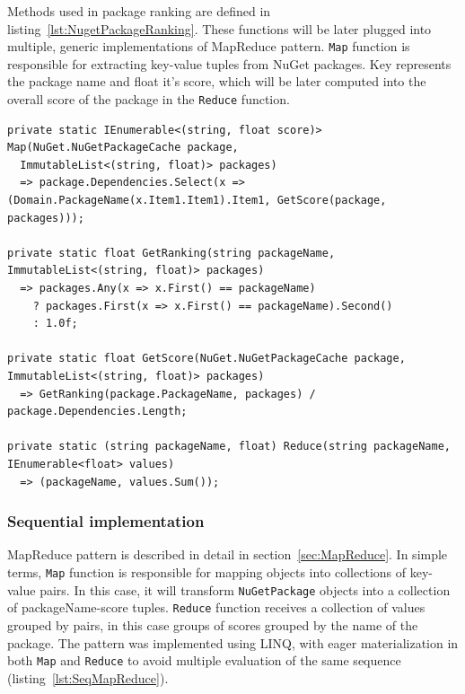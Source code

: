 Methods used in package ranking are defined in listing~\ref{lst:NugetPackageRanking}. These functions will be later plugged into multiple, generic implementations of MapReduce pattern. \texttt{Map} function is responsible for extracting key-value tuples from NuGet packages. Key represents the package name and float it's score, which will be later computed into the overall score of the package in the \texttt{Reduce} function.

\begin{lstlisting}[language={[sharp]c}, style=sharpcstyle, caption={Nuget package ranking functions}, label={lst:NugetPackageRanking},
numbers=none, xleftmargin=0pt,framexleftmargin=0pt,framexrightmargin=0pt,framexbottommargin=0pt]
private static IEnumerable<(string, float score)> Map(NuGet.NuGetPackageCache package,
  ImmutableList<(string, float)> packages)
  => package.Dependencies.Select(x => (Domain.PackageName(x.Item1.Item1).Item1, GetScore(package, packages)));

private static float GetRanking(string packageName, ImmutableList<(string, float)> packages)
  => packages.Any(x => x.First() == packageName)
    ? packages.First(x => x.First() == packageName).Second()
    : 1.0f;

private static float GetScore(NuGet.NuGetPackageCache package, ImmutableList<(string, float)> packages)
  => GetRanking(package.PackageName, packages) / package.Dependencies.Length;

private static (string packageName, float) Reduce(string packageName, IEnumerable<float> values)
  => (packageName, values.Sum());
\end{lstlisting}

\subsubsection{Sequential implementation}
MapReduce pattern is described in detail in section~\ref{sec:MapReduce}. 
In simple terms, \texttt{Map} function is responsible for mapping objects into collections of key-value pairs. In this case, it will transform \texttt{NuGetPackage} objects into a collection of packageName-score tuples.  \texttt{Reduce} function receives a collection of values grouped by pairs, in this case groups of scores grouped by the name of the package. The pattern was implemented using LINQ, with eager materialization in both \texttt{Map} and \texttt{Reduce} to avoid multiple evaluation of the same sequence (listing~\ref{lst:SeqMapReduce}).

